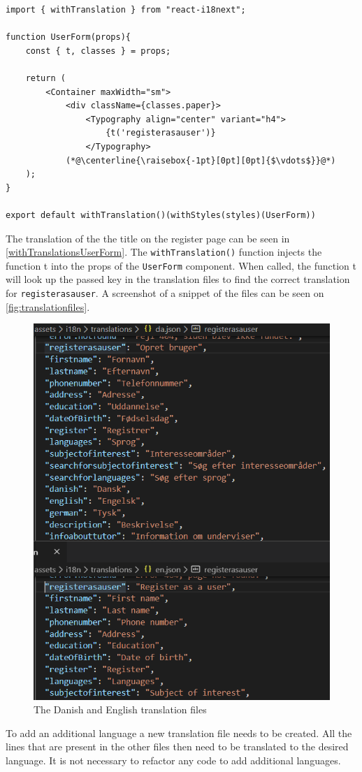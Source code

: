 \begin{lstlisting}[caption={Translated header when registering as a user.}, captionpos=b, label={withTranslationsUserForm}]
import { withTranslation } from "react-i18next";

function UserForm(props){
    const { t, classes } = props;

    return (
        <Container maxWidth="sm">
            <div className={classes.paper}>
                <Typography align="center" variant="h4">
                    {t('registerasauser')}
                </Typography>
            (*@\centerline{\raisebox{-1pt}[0pt][0pt]{$\vdots$}}@*)
    );
}

export default withTranslation()(withStyles(styles)(UserForm))
\end{lstlisting}
\noindent
The translation of the the title on the register page can be seen in \autoref{withTranslationsUserForm}.
The \texttt{withTranslation()} function injects the function t into the props of the \texttt{UserForm} component.
When called, the function t will look up the passed key in the translation files to find the correct translation for \texttt{registerasauser}. 
A screenshot of a snippet of the files can be seen on \autoref{fig:translationfiles}.
\begin{figure}[H]
    \centering
    \includegraphics[scale=0.5]{figures/translationexample.PNG}
    \caption{The Danish and English translation files}
    \label{fig:translationfiles}
\end{figure}
\noindent
To add an additional language a new translation file needs to be created.
All the lines that are present in the other files then need to be translated to the desired language. 
It is not necessary to refactor any code to add additional languages.
